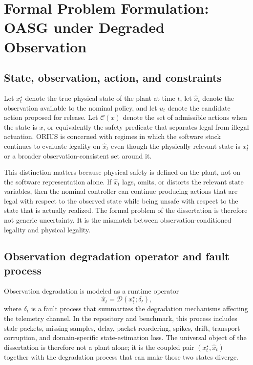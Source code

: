 \chapter[Formal Problem Formulation]{Formal Problem Formulation: OASG under Degraded Observation}
\label{ch:formal-problem-formulation}

\section{State, observation, action, and constraints}
Let $x_t^\star$ denote the true physical state of the plant at time $t$, let $\hat{x}_t$ denote
the observation available to the nominal policy, and let $u_t$ denote the candidate action
proposed for release. Let $\mathcal{C}(x)$ denote the set of admissible actions when the state is
$x$, or equivalently the safety predicate that separates legal from illegal actuation. ORIUS is
concerned with regimes in which the software stack continues to evaluate legality on $\hat{x}_t$
even though the physically relevant state is $x_t^\star$ or a broader observation-consistent set
around it.

This distinction matters because physical safety is defined on the plant, not on the software
representation alone. If $\hat{x}_t$ lags, omits, or distorts the relevant state variables, then
the nominal controller can continue producing actions that are legal with respect to the observed
state while being unsafe with respect to the state that is actually realized. The formal problem
of the dissertation is therefore not generic uncertainty. It is the mismatch between
observation-conditioned legality and physical legality.

\section{Observation degradation operator and fault process}
Observation degradation is modeled as a runtime operator
\[
\hat{x}_t = \mathcal{D}(x_t^\star;\delta_t),
\]
where $\delta_t$ is a fault process that summarizes the degradation mechanisms affecting the
telemetry channel. In the repository and benchmark, this process includes stale packets, missing
samples, delay, packet reordering, spikes, drift, transport corruption, and domain-specific
state-estimation loss. The universal object of the dissertation is therefore not a plant alone;
it is the coupled pair $(x_t^\star,\hat{x}_t)$ together with the degradation process that can make
those two states diverge.

